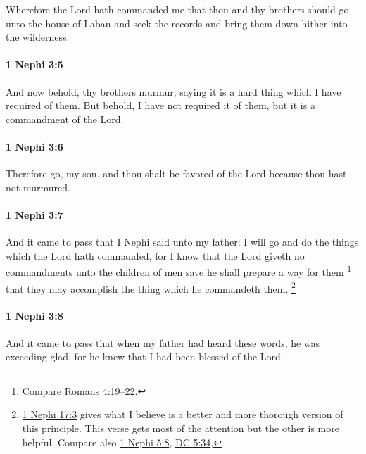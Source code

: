 			Wherefore the Lord hath commanded me
			that thou and thy brothers should go unto the house of Laban
			and seek the records and bring them down hither into the wilderness.

		\paragraph{1 Nephi 3:5} %
			\label{1NEPHI-3-5}

			And now behold, thy brothers murmur,
			saying it is a hard thing which I have required of them.
			But behold, I have not required it of them,
			but it is a commandment of the Lord.

		\paragraph{1 Nephi 3:6} %
			\label{1NEPHI-3-6}

			Therefore go, my son,
			and thou shalt be favored of the Lord
			because thou hast not murmured.

		\paragraph{1 Nephi 3:7} %
			\label{1NEPHI-3-7}

			And it came to pass that I Nephi said unto my father:
			I will go and do the things which the Lord hath commanded,
			for I know that the Lord giveth no commandments unto the children of men
			save he shall prepare a way for them%
				\footnote{%
					Compare \hyperref[ROMANS-4-19]{Romans 4:19--22}.
					}
			that they may accomplish the thing which he commandeth them.%
				\footnote{%
					\label{1NEPHI-3-7-NOTE-better}%
					\hyperref[1NEPHI-17-3]{1 Nephi 17:3} gives what I believe is a better and more thorough version of this principle. This verse gets most of the attention but the other is more helpful. Compare also \hyperref[1NEPHI-5-8]{1 Nephi 5:8}, \hyperref[DC5-34]{DC 5:34}, 
					}
					
		\paragraph{1 Nephi 3:8} %
			\label{1NEPHI-3-8}

			And it came to pass that when my father had heard these words,
			he was exceeding glad,
			for he knew that I had been blessed of the Lord.

